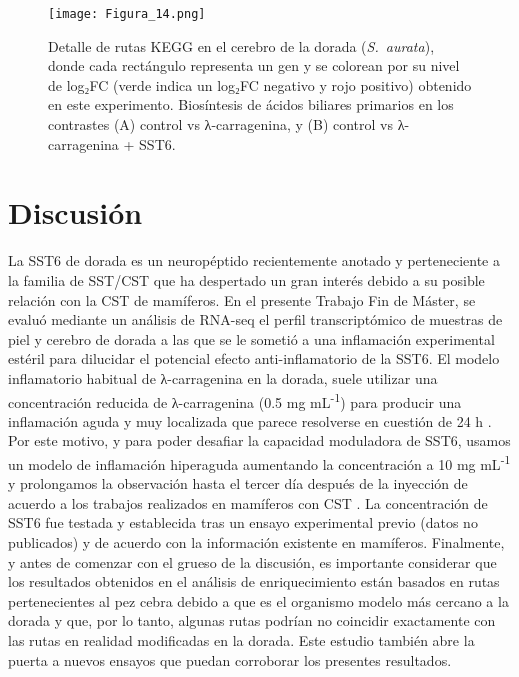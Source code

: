 \documentclass[10pt,a4paper]{article}
\begin{document}
\begin{figure}[htbp]
  \centering
 \texttt{[image: Figura\_14.png]}
 
  \caption{Detalle de rutas KEGG en el cerebro de la dorada (\textit{S.\ aurata}), donde cada rectángulo representa un gen y se colorean por su nivel de log₂FC (verde indica un log₂FC negativo y rojo positivo) obtenido en este experimento. Biosíntesis de ácidos biliares primarios en los contrastes (A) control vs λ-carragenina, y (B) control vs λ-carragenina + SST6.}
  \label{fig:14}
\end{figure}


\section{Discusión}
La SST6 de dorada es un neuropéptido recientemente anotado y perteneciente a la familia de SST/CST que ha despertado un gran interés debido a su posible relación con la CST de mamíferos. En el presente Trabajo Fin de Máster, se evaluó mediante un análisis de RNA-seq el perfil transcriptómico de muestras de piel y cerebro de dorada a las que se le sometió a una inflamación experimental estéril para dilucidar el potencial efecto anti-inflamatorio de la SST6. El modelo inflamatorio habitual de λ-carragenina en la dorada, suele utilizar una concentración reducida de λ-carragenina (0.5 mg mL\textsuperscript{-1}) para producir una inflamación aguda y muy localizada que parece resolverse en cuestión de 24 h \parencite{CamposSanchez2021a,CamposSanchez2021b}. Por este motivo, y para poder desafiar la capacidad moduladora de SST6, usamos un modelo de inflamación hiperaguda aumentando la concentración a 10 mg mL\textsuperscript{-1} \parencite{CamposSanchez2025} y prolongamos la observación hasta el tercer día después de la inyección de acuerdo a los trabajos realizados en mamíferos con CST \parencite{DelgadoMaroto2017,GonzalezRey2007}. La concentración de SST6 fue testada y establecida tras un ensayo experimental previo (datos no publicados) y de acuerdo con la información existente en mamíferos. Finalmente, y antes de comenzar con el grueso de la discusión, es importante considerar que los resultados obtenidos en el análisis de enriquecimiento están basados en rutas pertenecientes al pez cebra debido a que es el organismo modelo más cercano a la dorada y que, por lo tanto, algunas rutas podrían no coincidir exactamente con las rutas en realidad modificadas en la dorada. Este estudio también abre la puerta a nuevos ensayos que puedan corroborar los presentes resultados.
\end{document}
